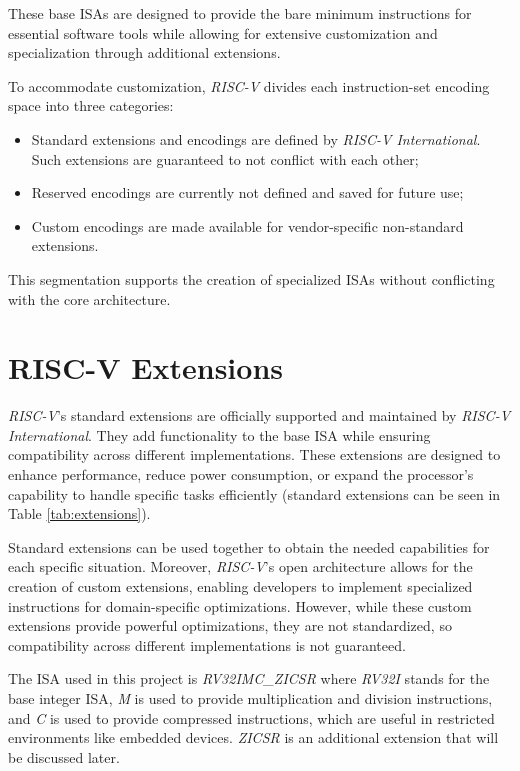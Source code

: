 These base ISAs are designed to provide the bare minimum instructions for essential
software tools while allowing for extensive customization and specialization through
additional extensions.

To accommodate customization, \textit{RISC-V} divides each instruction-set encoding
space into three categories:
\begin{itemize}
  \item Standard extensions and encodings are defined by \textit{RISC-V
    International}. Such extensions are guaranteed to not conflict with each other;

  \item Reserved encodings are currently not defined and saved for future use;

  \item Custom encodings are made available for vendor-specific non-standard extensions.
\end{itemize}
This segmentation supports the creation of specialized ISAs without conflicting
with the core architecture.

\section{RISC-V Extensions}
\label{sec:riscv_extensions}

\textit{RISC-V}'s standard extensions are officially supported and maintained by
\textit{RISC-V International}. They add functionality to the base ISA while
ensuring compatibility across different implementations. These extensions are designed
to enhance performance, reduce power consumption, or expand the processor's capability
to handle specific tasks efficiently (standard extensions can be seen in Table
\ref{tab:extensions}).

Standard extensions can be used together to obtain the needed capabilities for each
specific situation. Moreover, \textit{RISC-V}'s open architecture allows for the
creation of custom extensions, enabling developers to implement specialized instructions
for domain-specific optimizations. However, while these custom extensions provide
powerful optimizations, they are not standardized, so compatibility across different
implementations is not guaranteed.

The ISA used in this project is \textit{RV32IMC\_ZICSR} where \textit{RV32I} stands
for the base integer ISA, \textit{M} is used to provide multiplication and division
instructions, and \textit{C} is used to provide compressed instructions, which
are useful in restricted environments like embedded devices. \textit{ZICSR} is
an additional extension that will be discussed later.

